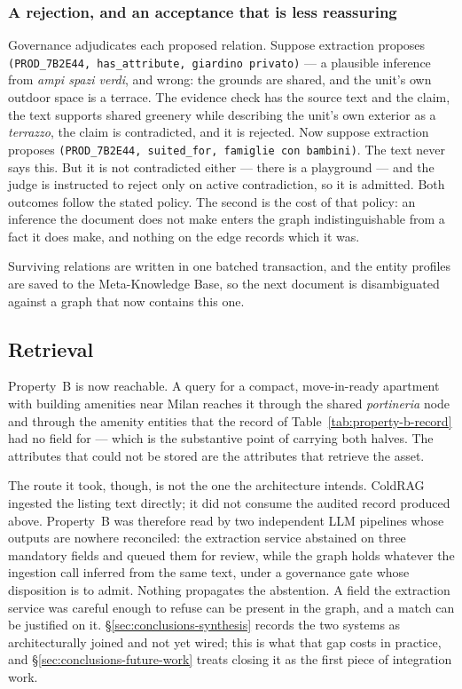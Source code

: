 \subsubsection{A rejection, and an acceptance that is less reassuring} 
Governance adjudicates each proposed relation. Suppose extraction proposes \texttt{(PROD\_7B2E44, has\_attribute, giardino privato)} --- a plausible inference from \emph{ampi spazi verdi}, and wrong: the grounds are shared, and the unit's own outdoor space is a terrace. The evidence check has the source text and the claim, the text supports shared greenery while describing the unit's own exterior as a \emph{terrazzo}, the claim is contradicted, and it is rejected. Now suppose extraction proposes \texttt{(PROD\_7B2E44, suited\_for, famiglie con bambini)}. The text never says this. But it is not contradicted either --- there is a playground --- and the judge is instructed to reject only on active contradiction, so it is admitted. Both outcomes follow the stated policy. The second is the cost of that policy: an inference the document does not make enters the graph indistinguishable from a fact it does make, and nothing on the edge records which it was.

Surviving relations are written in one batched transaction, and the entity profiles are saved to the Meta-Knowledge Base, so the next document is disambiguated against a graph that now contains this one.

\subsection{Retrieval}

Property~B is now reachable. A query for a compact, move-in-ready apartment with building amenities near Milan reaches it through the shared \emph{portineria} node and through the amenity entities that the record of Table~\ref{tab:property-b-record} had no field for --- which is the substantive point of carrying both halves. The attributes that could not be stored are the attributes that retrieve the asset.

The route it took, though, is not the one the architecture intends. ColdRAG ingested the listing text directly; it did not consume the audited record produced above. Property~B was therefore read by two independent LLM pipelines whose outputs are nowhere reconciled: the extraction service abstained on three mandatory fields and queued them for review, while the graph holds whatever the ingestion call inferred from the same text, under a governance gate whose disposition is to admit. Nothing propagates the abstention. A field the extraction service was careful enough to refuse can be present in the graph, and a match can be justified on it. \S\ref{sec:conclusions-synthesis} records the two systems as architecturally joined and not yet wired; this is what that gap costs in practice, and \S\ref{sec:conclusions-future-work} treats closing it as the first piece of integration work.



